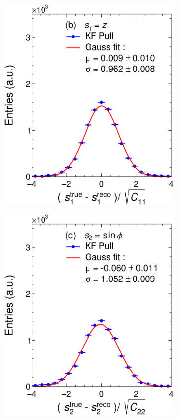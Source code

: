 \begin{figure}[t]
\begin{subfigure}{0.32\textwidth}
         \includegraphics[width=\textwidth]{figures/ch4-KF_NDGArLite/MC/ALICE+KF/UnitKFEnd_p1.eps}
         \caption{}
         \label{fig:resp1KF_GArLite_ALICE+KF}
     \end{subfigure}
    \begin{subfigure}{0.32\textwidth}
         \centering
         \includegraphics[width=\textwidth]{figures/ch4-KF_NDGArLite/MC/ALICE+KF/UnitKFEnd_p2.eps}

\end{subfigure}
\end{figure}
